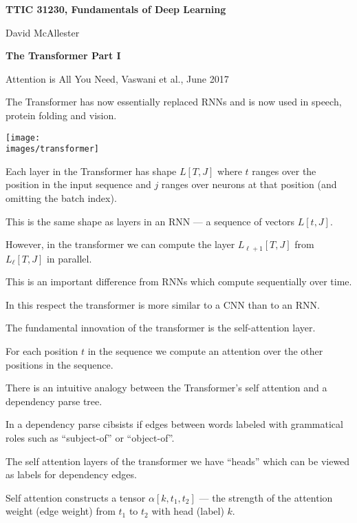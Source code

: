 





{\Huge
  \centerline{\bf TTIC 31230,  Fundamentals of Deep Learning}
  \vfill
  \centerline{David McAllester}
  \vfill
  \centerline{\bf  The Transformer Part I}
  \vfill
  \vfill


Attention is All You Need, Vaswani et al., June 2017

\vfill
The Transformer has now essentially replaced RNNs and is now used in speech, protein folding and vision.

\centerline{\texttt{[image: \\images/transformer]}}

\vfill
Each layer in the Transformer has shape $L[T,J]$ where $t$ ranges over the position in the input sequence and $j$ ranges over neurons at that position
(and omitting the batch index).

\vfill
This is the same shape as layers in an RNN --- a sequence of vectors $L[t,J]$.


However, in the transformer we can compute the layer $L_{\ell+1}[T,J]$ from $L_\ell[T,J]$ in parallel.

\vfill
This is an important difference from RNNs which compute sequentially over time.

\vfill
In this respect the transformer is more similar to a CNN than to an RNN.


The fundamental innovation of the transformer is the self-attention layer.

\vfill
For each position $t$ in the sequence we compute an attention over the other positions in the sequence.


There is an intuitive analogy between the Transformer's self attention and a dependency parse tree.

\vfill
In a dependency parse cibsists if edges between words labeled with grammatical roles such as ``subject-of'' or ``object-of''.

\vfill
The self attention layers of the transformer we have ``heads'' which can be viewed as labels for dependency edges.

\vfill
Self attention constructs a tensor $\alpha[k,t_1,t_2]$ --- the strength of the attention weight (edge weight)
from $t_1$ to $t_2$ with head (label) $k$.

}
